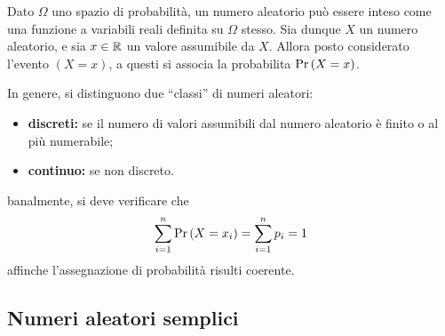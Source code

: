 \documentclass{subfiles}
\begin{document}
Dato \(\Omega\) uno spazio di probabilità, un numero aleatorio può essere inteso come una funzione a variabili reali definita su \(\Omega\) stesso.
Sia dunque \(X\) un numero aleatorio, e sia \(x \in \operatorname{\mathbb{R}}\) un valore assumibile da \(X\).
Allora posto considerato l'evento \((X = x)\), a questi si associa la probabilita \(\Prob{X = x}\).

In genere, si distinguono due ``classi'' di numeri aleatori:
\begin{itemize}
    \item \textbf{discreti:} se il numero di valori assumibili dal numero aleatorio è finito o al più numerabile;
    \item \textbf{continuo:} se non discreto.
\end{itemize}
\begin{Remark*}
    banalmente, si deve verificare che
    \[
        \Sum{\Prob{X = x_{i}}}{i = 1}[n] = \Sum{p_{i}}{i = 1}[n] = 1
    \]
    affinche l'assegnazione di probabilità risulti coerente.
\end{Remark*}
\subsection{Numeri aleatori semplici}

\end{document}
